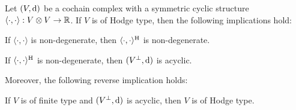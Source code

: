 \documentclass[\MainFolder/Text.tex]{subfiles}
\begin{document}
\begin{Proposition}\label{Prop:HodgeAcyc}
Let $(V,\mathrm{d})$ be a cochain complex with a symmetric cyclic structure $\langle\cdot,\cdot\rangle: V\otimes V\rightarrow\mathbb{R}$. If $V$ is of Hodge type, then the following implications hold:
\begin{ClaimList}
\item If $\langle \cdot,\cdot \rangle$ is non-degenerate, then $\langle \cdot,\cdot \rangle^{\mathrm{H}}$ is non-degenerate.
\item If $\langle \cdot,\cdot\rangle^{\mathrm{H}}$ is non-degenerate, then $(V^\perp,\mathrm{d})$ is acyclic.
\end{ClaimList}
Moreover, the following reverse implication holds:
\begin{ClaimList}[resume]
\item If $V$ is of finite type and $(V^\perp,\mathrm{d})$ is acyclic, then $V$ is of Hodge type.
\end{ClaimList}
\end{Proposition}
\end{document}
